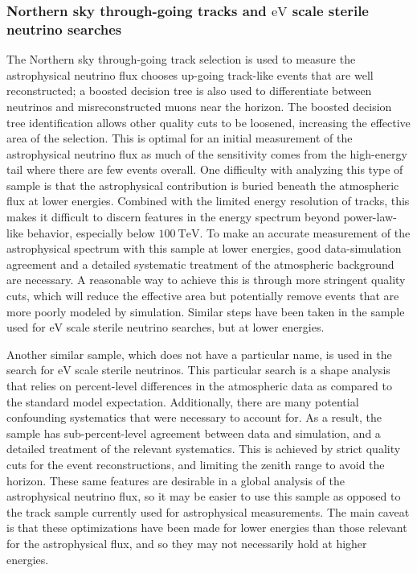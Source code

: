 \subsubsection{Northern sky through-going tracks and $\si\eV$ scale sterile neutrino searches}
The Northern sky through-going track selection is used to measure the astrophysical neutrino flux chooses up-going track-like events that are well reconstructed; a boosted decision tree is also used to differentiate between neutrinos and misreconstructed muons near the horizon.
The boosted decision tree identification allows other quality cuts to be loosened, increasing the effective area of the selection.
This is optimal for an initial measurement of the astrophysical neutrino flux as much of the sensitivity comes from the high-energy tail where there are few events overall.
One difficulty with analyzing this type of sample is that the astrophysical contribution is buried beneath the atmospheric flux at lower energies.
Combined with the limited energy resolution of tracks, this makes it difficult to discern features in the energy spectrum beyond power-law-like behavior, especially below $\SI{100}\TeV$.
To make an accurate measurement of the astrophysical spectrum with this sample at lower energies, good data-simulation agreement and a detailed systematic treatment of the atmospheric background are necessary.
A reasonable way to achieve this is through more stringent quality cuts, which will reduce the effective area but potentially remove events that are more poorly modeled by simulation.
Similar steps have been taken in the sample used for $\si\eV$ scale sterile neutrino searches, but at lower energies.

Another similar sample, which does not have a particular name, is used in the search for $\si\eV$ scale sterile neutrinos.
This particular search is a shape analysis that relies on percent-level differences in the atmospheric data as compared to the standard model expectation.
Additionally, there are many potential confounding systematics that were necessary to account for.
As a result, the sample has sub-percent-level agreement between data and simulation, and a detailed treatment of the relevant systematics.
This is achieved by strict quality cuts for the event reconstructions, and limiting the zenith range to avoid the horizon.
These same features are desirable in a global analysis of the astrophysical neutrino flux, so it may be easier to use this sample as opposed to the track sample currently used for astrophysical measurements.
The main caveat is that these optimizations have been made for lower energies than those relevant for the astrophysical flux, and so they may not necessarily hold at higher energies.

